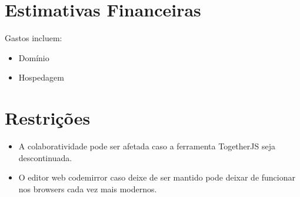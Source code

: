 \section{Estimativas Financeiras}

Gastos incluem:

\begin{itemize}
\item
  Domínio
\item
  Hospedagem
\end{itemize}
\section{Restrições}

\begin{itemize}
\item
  A colaboratividade pode ser afetada caso a ferramenta TogetherJS seja
  descontinuada.
\item
  O editor web codemirror caso deixe de ser mantido pode deixar de
  funcionar nos browsers cada vez mais modernos.
\end{itemize}
